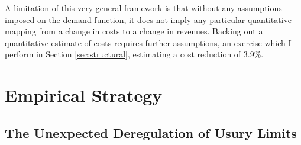 \documentclass[12pt,english]{article}
\begin{document}

A limitation of this very general framework is that without any assumptions imposed on the demand function, it does not imply any particular quantitative mapping from a change in costs to a change in revenues. Backing out a quantitative estimate of costs requires further assumptions, an exercise which I perform in Section \ref{sec:structural}, estimating a cost reduction of 3.9\%.




\section{Empirical Strategy}\label{sec:empirical-strategy}


\subsection{The Unexpected Deregulation of Usury Limits}
\end{document}
